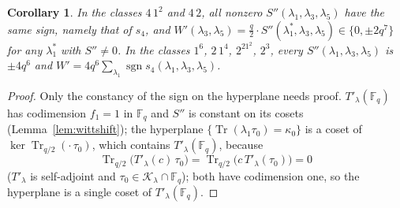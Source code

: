 ﻿\documentclass[12pt,a4paper]{amsart}
\newtheorem{corollary}[theorem]{Corollary}
\theoremstyle{definition}
\newcommand{\F}{\mathbb{F}}
\newcommand{\Tr}{\operatorname{Tr}}
\newcommand{\Kk}{\mathcal{K}}
\newcommand{\Spp}{S''}
\begin{document}
\begin{corollary}\label{cor:order4}
In the classes $4\,1^2$ and $4\,2$, all nonzero $\Spp(\lambda_1,\lambda_3,\lambda_5)$ have the same sign, namely that of $s_4$, and $W'(\lambda_3,\lambda_5)=\frac q2\cdot\Spp(\lambda_1^*,\lambda_3,\lambda_5)\in\{0,\pm2q^7\}$ for any $\lambda_1^*$ with $\Spp\ne0$. In the classes $1^6$, $2\,1^4$, $2^21^2$, $2^3$, every $\Spp(\lambda_1,\lambda_3,\lambda_5)$ is $\pm4q^6$ and $W'=4q^6\sum_{\lambda_1}\operatorname{sgn}s_4(\lambda_1,\lambda_3,\lambda_5)$.
\end{corollary}
\begin{proof}
Only the constancy of the sign on the hyperplane needs proof. $T'_\lambda(\F_q)$ has codimension $f_1=1$ in $\F_q$ and $\Spp$ is constant on its cosets (Lemma~\ref{lem:wittshift}); the hyperplane $\{\Tr(\lambda_1\tau_0)=\kappa_0\}$ is a coset of $\ker\Tr_{q/2}(\cdot\,\tau_0)$, which contains $T'_\lambda(\F_q)$, because
\[
\Tr_{q/2}\bigl(T'_\lambda(c)\,\tau_0\bigr)=\Tr_{q/2}\bigl(c\,T'_\lambda(\tau_0)\bigr)=0
\]
($T'_\lambda$ is self-adjoint and $\tau_0\in\Kk_\lambda\cap\F_q$); both have codimension one, so the hyperplane is a single coset of $T'_\lambda(\F_q)$.
\end{proof}
\end{document}
